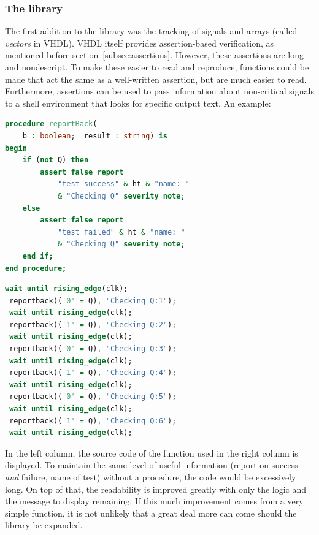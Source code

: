 \documentclass[11pt,british]{article}
\begin{document}
\subsubsection{The library}
\label{subsubsec:library}
The first addition to the library was the tracking of signals and arrays (called \emph{vectors} in VHDL). VHDL itself provides assertion-based verification, as mentioned before section~\ref{subsec:assertions}. However, these assertions are long and nondescript. To make these easier to read and reproduce, functions could be made that act the same as a well-written assertion, but are much easier to read. Furthermore, assertions can be used to pass information about non-critical signals to a shell environment that looks for specific output text. An example:
\begin{multicols}{2}
\begin{lstlisting}[language=VHDL, tabsize=4, frame=single, framesep=2mm, belowskip=8pt, aboveskip=8pt, showstringspaces=false, basicstyle=\footnotesize]
procedure reportBack(
	b : boolean;  result : string) is
begin
	if (not Q) then
		assert false report
			"test success" & ht & "name: "
			& "Checking Q" severity note;
	else
		assert false report
			"test failed" & ht & "name: "
			& "Checking Q" severity note;
	end if;
end procedure;
\end{lstlisting}
\columnbreak
\begin{lstlisting}[language=VHDL, tabsize=4, frame=single, framesep=2mm, belowskip=8pt, aboveskip=8pt, showstringspaces=false, basicstyle=\footnotesize]
 wait until rising_edge(clk);
 reportback(('0' = Q), "Checking Q:1");
 wait until rising_edge(clk);
 reportback(('1' = Q), "Checking Q:2");
 wait until rising_edge(clk);
 reportback(('0' = Q), "Checking Q:3");
 wait until rising_edge(clk);
 reportback(('1' = Q), "Checking Q:4");
 wait until rising_edge(clk);
 reportback(('0' = Q), "Checking Q:5");
 wait until rising_edge(clk);
 reportback(('1' = Q), "Checking Q:6");
 wait until rising_edge(clk);
\end{lstlisting}
\end{multicols}
\noindent In the left column, the source code of the function used in the right column is displayed. To maintain the same level of useful information (report on success \emph{and} failure, name of test) without a procedure, the code would be excessively long. On top of that, the readability is improved greatly with only the logic and the message to display remaining. If this much improvement comes from a very simple function, it is not unlikely that a great deal more can come should the library be expanded.
\end{document}
